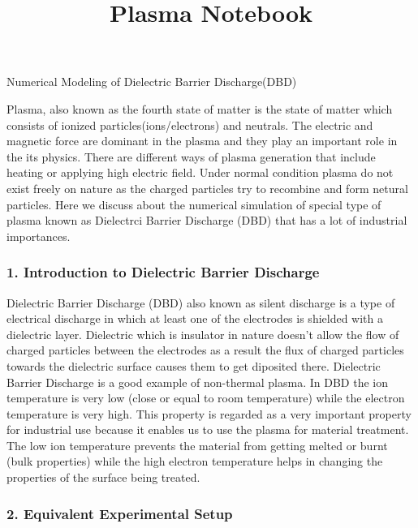 \documentclass[11pt]{article}
\title{Plasma Notebook}
\begin{document}
    
    
    \maketitle
    
    

    
    Numerical Modeling of Dielectric Barrier Discharge(DBD)

    Plasma, also known as the fourth state of matter is the state of matter
which consists of ionized particles(ions/electrons) and neutrals. The
electric and magnetic force are dominant in the plasma and they play an
important role in the its physics. There are different ways of plasma
generation that include heating or applying high electric field. Under
normal condition plasma do not exist freely on nature as the charged
particles try to recombine and form netural particles. Here we discuss
about the numerical simulation of special type of plasma known as
Dielectrci Barrier Discharge (DBD) that has a lot of industrial
importances.

    \subsubsection{1. Introduction to Dielectric Barrier
Discharge}\label{introduction-to-dielectric-barrier-discharge}

Dielectric Barrier Discharge (DBD) also known as silent discharge is a
type of electrical discharge in which at least one of the electrodes is
shielded with a dielectric layer. Dielectric which is insulator in
nature doesn't allow the flow of charged particles between the
electrodes as a result the flux of charged particles towards the
dielectric surface causes them to get diposited there. Dielectric
Barrier Discharge is a good example of non-thermal plasma. In DBD the
ion temperature is very low (close or equal to room temperature) while
the electron temperature is very high. This property is regarded as a
very important property for industrial use because it enables us to use
the plasma for material treatment. The low ion temperature prevents the
material from getting melted or burnt (bulk properties) while the high
electron temperature helps in changing the properties of the surface
being treated.

    \subsubsection{2. Equivalent Experimental
Setup}\label{equivalent-experimental-setup}
\end{document}
